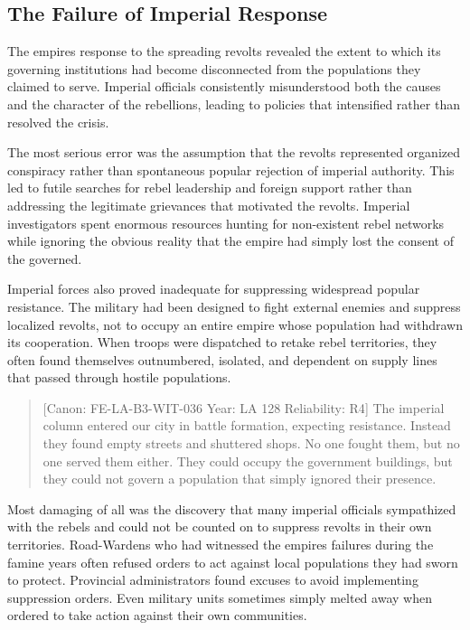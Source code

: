 \subsection{The Failure of Imperial
Response}\label{the-failure-of-imperial-response}

The empire\textquotesingle s response to the spreading revolts revealed
the extent to which its governing institutions had become disconnected
from the populations they claimed to serve. Imperial officials
consistently misunderstood both the causes and the character of the
rebellions, leading to policies that intensified rather than resolved
the crisis.

The most serious error was the assumption that the revolts represented
organized conspiracy rather than spontaneous popular rejection of
imperial authority. This led to futile searches for rebel leadership and
foreign support rather than addressing the legitimate grievances that
motivated the revolts. Imperial investigators spent enormous resources
hunting for non-existent rebel networks while ignoring the obvious
reality that the empire had simply lost the consent of the governed.

Imperial forces also proved inadequate for suppressing widespread
popular resistance. The military had been designed to fight external
enemies and suppress localized revolts, not to occupy an entire empire
whose population had withdrawn its cooperation. When troops were
dispatched to retake rebel territories, they often found themselves
outnumbered, isolated, and dependent on supply lines that passed through
hostile populations.

\begin{quote}
{[}Canon: FE-LA-B3-WIT-036 \textbar{} Year: LA 128 \textbar{}
Reliability: R4{]} The imperial column entered our city in battle
formation, expecting resistance. Instead they found empty streets and
shuttered shops. No one fought them, but no one served them either. They
could occupy the government buildings, but they could not govern a
population that simply ignored their presence.
\end{quote}

Most damaging of all was the discovery that many imperial officials
sympathized with the rebels and could not be counted on to suppress
revolts in their own territories. Road-Wardens who had witnessed the
empire\textquotesingle s failures during the famine years often refused
orders to act against local populations they had sworn to protect.
Provincial administrators found excuses to avoid implementing
suppression orders. Even military units sometimes simply melted away
when ordered to take action against their own communities.

